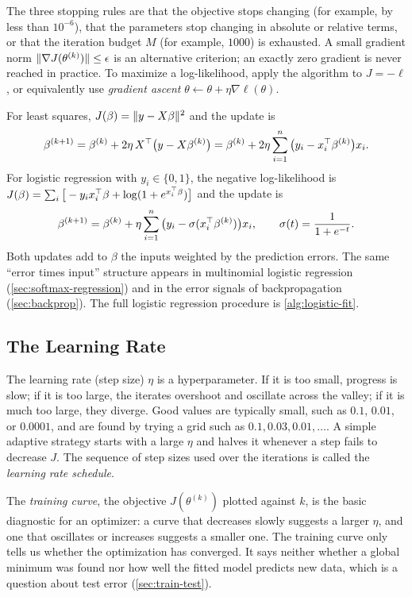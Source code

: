 The three stopping rules are that the objective stops changing (for example, by less than $10^{-6}$), that the parameters stop changing in absolute or relative terms, or that the iteration budget $M$ (for example, $1000$) is exhausted. A small gradient norm $\lVert \nabla J(\theta^{(k)})\rVert\le\epsilon$ is an alternative criterion; an exactly zero gradient is never reached in practice. To maximize a log-likelihood, apply the algorithm to $J=-\ell$, or equivalently use \emph{gradient ascent} $\theta\gets\theta+\eta\nabla\ell(\theta)$.

\begin{remark}\label{rem:gd-examples}
For least squares, $J(\beta)=\lVert y-X\beta\rVert^2$ and the update is
\[
\beta^{(k+1)}=\beta^{(k)}+2\eta\,X^{\top}\big(y-X\beta^{(k)}\big)=\beta^{(k)}+2\eta\sum_{i=1}^n\big(y_i-x_i^{\top}\beta^{(k)}\big)x_i.
\]
For logistic regression with $y_i\in\{0,1\}$, the negative log-likelihood is $J(\beta)=\sum_i\big[-y_ix_i^{\top}\beta+\log(1+e^{x_i^{\top}\beta})\big]$ and the update is
\[
\beta^{(k+1)}=\beta^{(k)}+\eta\sum_{i=1}^n\big(y_i-\sigma(x_i^{\top}\beta^{(k)})\big)x_i,\qquad \sigma(t)=\frac{1}{1+e^{-t}}.
\]
Both updates add to $\beta$ the inputs weighted by the prediction errors. The same ``error times input'' structure appears in multinomial logistic regression (\cref{sec:softmax-regression}) and in the error signals of backpropagation (\cref{sec:backprop}). The full logistic regression procedure is \cref{alg:logistic-fit}.
\end{remark}

\subsection{The Learning Rate}

The learning rate (step size) $\eta$ is a hyperparameter. If it is too small, progress is slow; if it is too large, the iterates overshoot and oscillate across the valley; if it is much too large, they diverge. Good values are typically small, such as $0.1$, $0.01$, or $0.0001$, and are found by trying a grid such as $0.1,0.03,0.01,\dots$. A simple adaptive strategy starts with a large $\eta$ and halves it whenever a step fails to decrease $J$. The sequence of step sizes used over the iterations is called the \emph{learning rate schedule}.

The \emph{training curve}, the objective $J(\theta^{(k)})$ plotted against $k$, is the basic diagnostic for an optimizer: a curve that decreases slowly suggests a larger $\eta$, and one that oscillates or increases suggests a smaller one. The training curve only tells us whether the optimization has converged. It says neither whether a global minimum was found nor how well the fitted model predicts new data, which is a question about test error (\cref{sec:train-test}).

